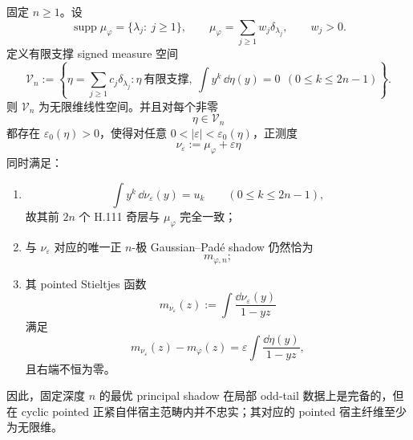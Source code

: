 \begin{theorem}\label{thm:conclusion-principal-shadow-fixed-depth-pointed-host-infiber}
固定 \(n\ge 1\)。设
\[
\operatorname{supp}\mu_\varphi=\{\lambda_j:\ j\ge 1\},
\qquad
\mu_\varphi=\sum_{j\ge 1}w_j\delta_{\lambda_j},
\qquad
w_j>0.
\]
定义有限支撑 signed measure 空间
\[
\mathcal V_n
:=
\left\{
\eta=\sum_{j\ge 1}c_j\delta_{\lambda_j}:
\eta\ \text{有限支撑},
\ \int y^k\,\dd\eta(y)=0\ \ (0\le k\le 2n-1)
\right\}.
\]
则 \(\mathcal V_n\) 为无限维线性空间。并且对每个非零
\[
\eta\in \mathcal V_n
\]
都存在 \(\varepsilon_0(\eta)>0\)，使得对任意 \(0<|\varepsilon|<\varepsilon_0(\eta)\)，正测度
\[
\nu_\varepsilon:=\mu_\varphi+\varepsilon\eta
\]
同时满足：
\begin{enumerate}
\item
\[
\int y^k\,\dd\nu_\varepsilon(y)=u_k
\qquad
(0\le k\le 2n-1),
\]
故其前 \(2n\) 个 H.111 奇层与 \(\mu_\varphi\) 完全一致；
\item 与 \(\nu_\varepsilon\) 对应的唯一正 \(n\)-极 Gaussian--Pad\'e shadow 仍然恰为
\[
m_{\varphi,n};
\]
\item 其 pointed Stieltjes 函数
\[
m_{\nu_\varepsilon}(z)
:=
\int\frac{\dd\nu_\varepsilon(y)}{1-yz}
\]
满足
\[
m_{\nu_\varepsilon}(z)-m_\varphi(z)
=
\varepsilon\int\frac{\dd\eta(y)}{1-yz},
\]
且右端不恒为零。
\end{enumerate}
因此，固定深度 \(n\) 的最优 principal shadow 在局部 odd-tail 数据上是完备的，但在 cyclic pointed 正紧自伴宿主范畴内并不忠实；其对应的 pointed 宿主纤维至少为无限维。
\end{theorem}
